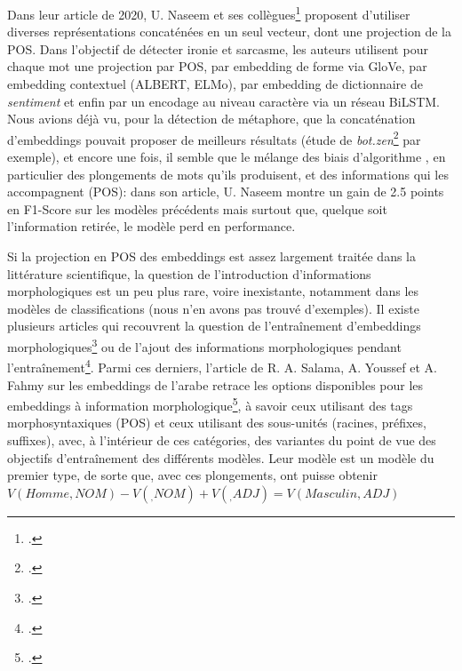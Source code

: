 Dans leur article de 2020, U. Naseem et ses collègues\footcite{naseem_towards_2020} proposent d'utiliser diverses représentations concaténées en un seul vecteur, dont une projection de la POS. Dans l'objectif de détecter ironie et sarcasme, les auteurs utilisent pour chaque mot une projection par POS, par embedding de forme via GloVe, par embedding contextuel (ALBERT, ELMo), par embedding de dictionnaire de \textit{sentiment} et enfin par un encodage au niveau caractère via un réseau BiLSTM. Nous avions déjà vu, pour la détection de métaphore, que la concaténation d'embeddings pouvait proposer de meilleurs résultats (étude de \textit{bot.zen}\footcite{stemle_using_2018} par exemple), et encore une fois, il semble que le mélange des biais d'algorithme  , en particulier des plongements de mots qu'ils produisent, et des informations qui les accompagnent (POS): dans son article, U. Naseem montre un gain de 2.5 points en F1-Score sur les modèles précédents mais surtout que, quelque soit l'information retirée, le modèle perd en performance.

Si la projection en POS des embeddings est assez largement traitée dans la littérature scientifique, la question de l'introduction d'informations morphologiques est un peu plus rare, voire inexistante, notamment dans les modèles de classifications (nous n'en avons pas trouvé d'exemples). Il existe plusieurs articles qui recouvrent la question de l'entraînement d'embeddings morphologiques\footcite{cotterell_morphological_2015} ou de l'ajout des informations morphologiques pendant l'entraînement\footcite{cui_knet_2015}. Parmi ces derniers, l'article de R. A. Salama, A. Youssef et A. Fahmy sur les embeddings de l'arabe retrace les options disponibles pour les embeddings à information morphologique\footcite{salama_morphological_2018}, à savoir ceux utilisant des tags morphosyntaxiques (POS) et ceux utilisant des sous-unités (racines, préfixes, suffixes), avec, à l'intérieur de ces catégories, des variantes du point de vue des objectifs d'entraînement des différents modèles. Leur modèle est un modèle du premier type, de sorte que, avec ces plongements, ont puisse obtenir $V(Homme,NOM) - V(_,NOM) + V(_,ADJ) = V(Masculin,ADJ)$

